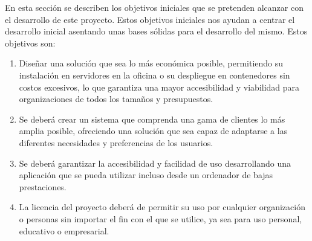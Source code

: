 En esta sección se describen los objetivos iniciales que se pretenden alcanzar con el desarrollo de este proyecto. Estos objetivos iniciales nos ayudan a centrar el desarrollo inicial asentando unas bases sólidas para el desarrollo del mismo. Estos objetivos son:

\begin{enumerate}
    \item Diseñar una solución que sea lo más económica posible, permitiendo su instalación en servidores en la oficina o su despliegue en contenedores sin costos excesivos, lo que garantiza una mayor accesibilidad y viabilidad para organizaciones de todos los tamaños y presupuestos.
    \item Se deberá crear un sistema que comprenda una gama de clientes lo más amplia posible, ofreciendo una solución que sea capaz de adaptarse a las diferentes necesidades y preferencias de los usuarios.
    \item Se deberá garantizar la accesibilidad y facilidad de uso desarrollando una aplicación que se pueda utilizar incluso desde un ordenador de bajas prestaciones.
    \item La licencia del proyecto deberá de permitir su uso por cualquier organización o personas sin importar el fin con el que se utilice, ya sea para uso personal, educativo o empresarial.
\end{enumerate}